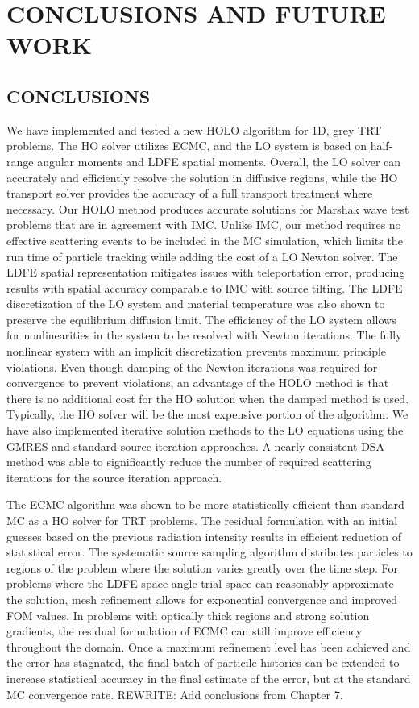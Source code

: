 \chapter{ \uppercase{Conclusions and Future Work} }
\label{chp:conclusions}

\section{CONCLUSIONS}

We have implemented and tested a new HOLO algorithm for 1D, grey TRT problems.  The HO
solver utilizes ECMC, and the LO system is based on half-range angular moments and LDFE
spatial moments. Overall, the LO solver can accurately and efficiently resolve the solution in diffusive regions, while the HO
transport solver provides the accuracy of a full transport treatment where necessary. 
Our HOLO method produces accurate solutions for Marshak wave test
problems that are in agreement with IMC.  Unlike IMC, our method requires no effective
scattering events to be included in the MC simulation, which limits the run time of
particle tracking while adding the cost of a LO Newton solver. The LDFE spatial
representation mitigates issues with teleportation error, producing results with spatial
accuracy comparable to IMC with source tilting.  The LDFE discretization of the LO system
and material temperature was also shown to preserve the equilibrium diffusion limit.  
The efficiency of the LO system allows for nonlinearities in the system to be resolved
with Newton iterations.  The fully nonlinear system with an implicit discretization
prevents maximum principle violations. Even though damping of the Newton iterations was
required for convergence to prevent violations, an advantage of the HOLO method is that
there is no additional cost for the HO solution when the damped method is used.
Typically, the HO solver will be the most expensive portion of the algorithm. 
We have also implemented iterative solution methods to the LO equations using the GMRES and
standard source iteration approaches.  A nearly-consistent DSA method was able to
significantly reduce the number of required scattering iterations for the source iteration
approach. 

The ECMC algorithm was shown to be more statistically efficient than standard MC as a HO
solver for TRT problems.  The residual formulation with an initial guesses based on the
previous radiation intensity results in efficient reduction of statistical error.  The
systematic source sampling algorithm distributes particles to regions of the problem where the
solution varies greatly over the time step.  For problems where the LDFE space-angle trial space
can reasonably approximate the solution, mesh refinement allows for exponential
convergence and improved FOM values.   In problems with optically
thick regions and strong solution gradients, the residual formulation of ECMC can still
improve efficiency throughout the domain.  Once a maximum refinement level has been
achieved and the error has stagnated, the final batch of particile histories can be 
extended to increase statistical accuracy in the final estimate of the error, but at the
standard MC convergence rate.
REWRITE: Add conclusions from Chapter 7.

